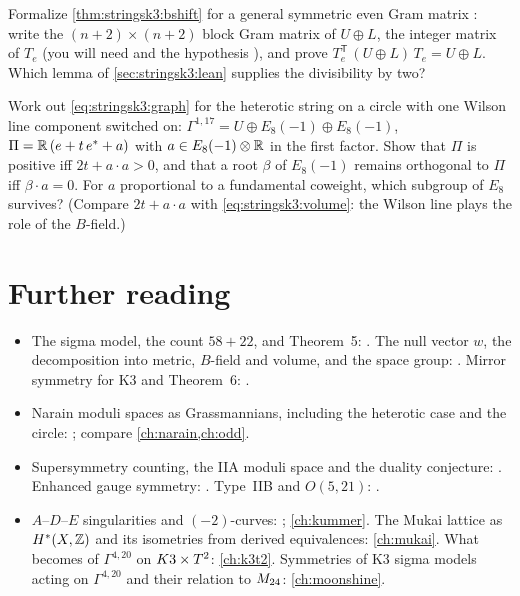 \begin{exercise}\label{exo:stringsk3:leanTe}
Formalize \cref{thm:stringsk3:bshift} for a general symmetric even Gram matrix
: write the $(n+2)\times(n+2)$ block Gram matrix of $U\oplus L$, the integer
matrix of $T_e$ (you will need  and the hypothesis
), and prove $T_e^{\mathsf T}\,(U\oplus L)\,T_e=U\oplus L$. Which lemma of
\cref{sec:stringsk3:lean} supplies the divisibility by two?
\end{exercise}

\begin{exercise}[$\star\star\star$]\label{exo:stringsk3:het}
Work out \eqref{eq:stringsk3:graph} for the heterotic string on a circle with one Wilson line
component switched on: $\Gamma^{1,17}=U\oplus E_8(-1)\oplus E_8(-1)$, $\Pi=\mathbb{R}\,(e+t\,e^*+a)$
with $a\in E_8(-1)\otimes\mathbb{R}$ in the first factor. Show that $\Pi$ is positive iff
$2t+a\cdot a>0$, and that a root $\beta$ of $E_8(-1)$ remains orthogonal to $\Pi$ iff
$\beta\cdot a=0$. For $a$ proportional to a fundamental coweight, which subgroup of $E_8$
survives? (Compare $2t+a\cdot a$ with \eqref{eq:stringsk3:volume}: the Wilson line plays the role
of the $B$-field.)
\end{exercise}

\section*{Further reading}
\begin{itemize}[leftmargin=*]
\item The sigma model, the count $58+22$, and Theorem~5: .
  The null vector $w$, the decomposition into metric, $B$-field and volume, and the space
  group: . Mirror symmetry for K3 and Theorem~6:
  .
\item Narain moduli spaces as Grassmannians, including the heterotic case and the circle:
  ; compare \cref{ch:narain,ch:odd}.
\item Supersymmetry counting, the IIA moduli space and the duality conjecture:
  . Enhanced gauge symmetry: . Type~IIB and $O(5,21)$: .
\item $A$--$D$--$E$ singularities and $(-2)$-curves: ;
  \cref{ch:kummer}. The Mukai lattice as $H^*(X,\mathbb{Z})$ and its isometries from derived equivalences:
  \cref{ch:mukai}. What becomes of $\Gamma^{4,20}$ on $K3\times T^2$: \cref{ch:k3t2}. Symmetries of K3
  sigma models acting on $\Gamma^{4,20}$ and their relation to $M_{24}$: \cref{ch:moonshine}.
\end{itemize}
